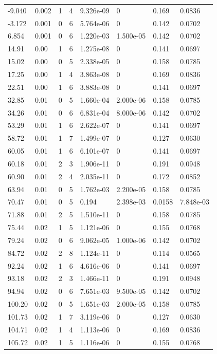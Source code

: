 \documentclass[preview]{standalone}
\begin{document}
{{\begin{tabular}{L{1.2cm}C{1.2cm} C{0.3cm}C{0.5cm} C{1.4cm}C{1.4cm} C{1.4cm}C{1.4cm}}
  -9.040  &  0.002  & 1     &  4 &  9.326e-09  & 0  & 0.169 &  0.0836   \\ 
  -3.172  &  0.001  & 0     &  6 &  5.764e-06  & 0  & 0.142 &  0.0702   \\ 
  6.854  &  0.001  & 0     &  6 &  1.220e-03  & 1.500e-05  & 0.142 &  0.0702   \\ 
  14.91  &  0.00  & 1     &  6 &  1.275e-08  & 0  & 0.141 &  0.0697   \\ 
  15.02  &  0.00  & 0     &  5 &  2.338e-05  & 0  & 0.158 &  0.0785   \\ 
  17.25  &  0.00  & 1     &  4 &  3.863e-08  & 0  & 0.169 &  0.0836   \\ 
  22.51  &  0.00  & 1     &  6 &  3.883e-08  & 0  & 0.141 &  0.0697   \\ 
  32.85  &  0.01  & 0     &  5 &  1.660e-04  & 2.000e-06  & 0.158 &  0.0785   \\ 
  34.26  &  0.01  & 0     &  6 &  6.831e-04  & 8.000e-06  & 0.142 &  0.0702   \\ 
  53.29  &  0.01  & 1     &  6 &  2.622e-07  & 0  & 0.141 &  0.0697   \\ 
  58.72  &  0.01  & 1     &  7 &  1.499e-07  & 0  & 0.127 &  0.0630   \\ 
  60.05  &  0.01  & 1     &  6 &  6.101e-07  & 0  & 0.141 &  0.0697   \\ 
  60.18  &  0.01  & 2     &  3 &  1.906e-11  & 0  & 0.191 &  0.0948   \\ 
  60.90  &  0.01  & 2     &  4 &  2.035e-11  & 0  & 0.172 &  0.0852   \\ 
  63.94  &  0.01  & 0     &  5 &  1.762e-03  & 2.200e-05  & 0.158 &  0.0785   \\ 
  70.47  &  0.01  & 0     &  5 &  0.194  & 2.398e-03  & 0.0158 &  7.848e-03   \\ 
  71.88  &  0.01  & 2     &  5 &  1.510e-11  & 0  & 0.158 &  0.0785   \\ 
  75.44  &  0.02  & 1     &  5 &  1.121e-06  & 0  & 0.155 &  0.0768   \\ 
  79.24  &  0.02  & 0     &  6 &  9.062e-05  & 1.000e-06  & 0.142 &  0.0702   \\ 
  84.72  &  0.02  & 2     &  8 &  1.124e-11  & 0  & 0.114 &  0.0565   \\ 
  92.24  &  0.02  & 1     &  6 &  4.616e-06  & 0  & 0.141 &  0.0697   \\ 
  93.18  &  0.02  & 2     &  3 &  1.466e-11  & 0  & 0.191 &  0.0948   \\ 
  94.94  &  0.02  & 0     &  6 &  7.651e-03  & 9.500e-05  & 0.142 &  0.0702   \\ 
  100.20  &  0.02  & 0     &  5 &  1.651e-03  & 2.000e-05  & 0.158 &  0.0785   \\ 
  101.73  &  0.02  & 1     &  7 &  3.119e-06  & 0  & 0.127 &  0.0630   \\ 
  104.71  &  0.02  & 1     &  4 &  1.113e-06  & 0  & 0.169 &  0.0836   \\ 
  105.72  &  0.02  & 1     &  5 &  1.116e-06  & 0  & 0.155 &  0.0768   \\ 
\hline 
\end{tabular} 

}}
\end{document}
